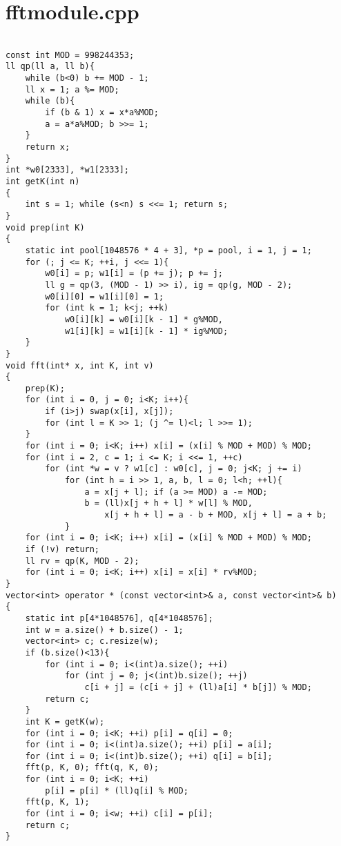 \documentclass[a4paper,12pt]{report}
\begin{document}
\section{fftmodule.cpp}
\begin{lstlisting}

const int MOD = 998244353;
ll qp(ll a, ll b){
    while (b<0) b += MOD - 1;
    ll x = 1; a %= MOD;
    while (b){
        if (b & 1) x = x*a%MOD;
        a = a*a%MOD; b >>= 1;
    }
    return x;
}
int *w0[2333], *w1[2333];
int getK(int n)
{
    int s = 1; while (s<n) s <<= 1; return s;
}
void prep(int K)
{
    static int pool[1048576 * 4 + 3], *p = pool, i = 1, j = 1;
    for (; j <= K; ++i, j <<= 1){
        w0[i] = p; w1[i] = (p += j); p += j;
        ll g = qp(3, (MOD - 1) >> i), ig = qp(g, MOD - 2);
        w0[i][0] = w1[i][0] = 1;
        for (int k = 1; k<j; ++k)
            w0[i][k] = w0[i][k - 1] * g%MOD,
            w1[i][k] = w1[i][k - 1] * ig%MOD;
    }
}
void fft(int* x, int K, int v)
{
    prep(K);
    for (int i = 0, j = 0; i<K; i++){
        if (i>j) swap(x[i], x[j]);
        for (int l = K >> 1; (j ^= l)<l; l >>= 1);
    }
    for (int i = 0; i<K; i++) x[i] = (x[i] % MOD + MOD) % MOD;
    for (int i = 2, c = 1; i <= K; i <<= 1, ++c)
        for (int *w = v ? w1[c] : w0[c], j = 0; j<K; j += i)
            for (int h = i >> 1, a, b, l = 0; l<h; ++l){
                a = x[j + l]; if (a >= MOD) a -= MOD;
                b = (ll)x[j + h + l] * w[l] % MOD,
                    x[j + h + l] = a - b + MOD, x[j + l] = a + b;
            }
    for (int i = 0; i<K; i++) x[i] = (x[i] % MOD + MOD) % MOD;
    if (!v) return;
    ll rv = qp(K, MOD - 2);
    for (int i = 0; i<K; i++) x[i] = x[i] * rv%MOD;
}
vector<int> operator * (const vector<int>& a, const vector<int>& b)
{
    static int p[4*1048576], q[4*1048576];
    int w = a.size() + b.size() - 1;
    vector<int> c; c.resize(w);
    if (b.size()<13){
        for (int i = 0; i<(int)a.size(); ++i)
            for (int j = 0; j<(int)b.size(); ++j)
                c[i + j] = (c[i + j] + (ll)a[i] * b[j]) % MOD;
        return c;
    }
    int K = getK(w);
    for (int i = 0; i<K; ++i) p[i] = q[i] = 0;
    for (int i = 0; i<(int)a.size(); ++i) p[i] = a[i];
    for (int i = 0; i<(int)b.size(); ++i) q[i] = b[i];
    fft(p, K, 0); fft(q, K, 0);
    for (int i = 0; i<K; ++i)
        p[i] = p[i] * (ll)q[i] % MOD;
    fft(p, K, 1);
    for (int i = 0; i<w; ++i) c[i] = p[i];
    return c;
}
\end{lstlisting}
\end{document}
